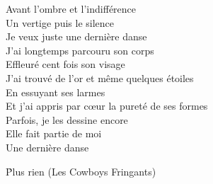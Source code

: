 \documentclass{novel}
\begin{document}
\begin{multicols}{2}
Avant l'ombre et l'indifférence \\
Un vertige puis le silence \\
Je veux juste une dernière danse \\

J'ai longtemps parcouru son corps \\
Effleuré cent fois son visage \\
J'ai trouvé de l'or et même quelques étoiles \\
En essuyant ses larmes \\
Et j'ai appris par cœur la pureté de ses formes \\
Parfois, je les dessine encore \\
Elle fait partie de moi \\

Une dernière danse
\end{multicols}

\newpage
\small
\h*{Plus rien (Les Cowboys Fringants)}
\end{document}
